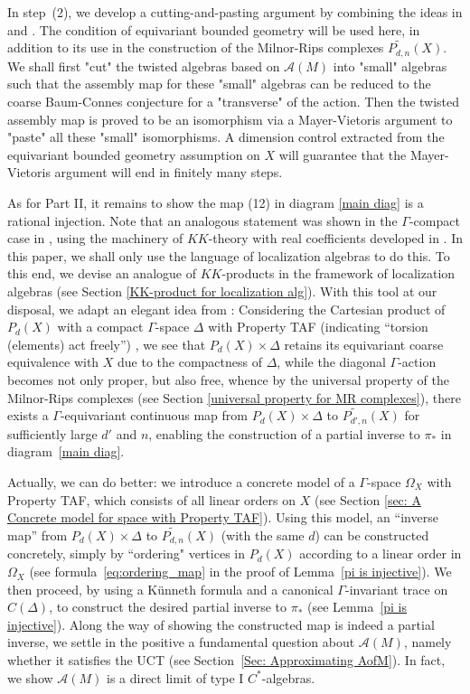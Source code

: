 \documentclass[11pt]{article}
\theoremstyle{definition}
\theoremstyle{plain}
\def\A{\mathcal A}\def\C{\mathcal C}\def\B{\mathcal B}\def\E{\mathcal E}\def\O{\mathcal O}\def\h{\mathfrak h}\def\K{\mathcal K}\def\F{\mathcal F}\def\P{\mathcal P}\def\L{\mathcal L}\def\R{\mathcal R}\def\Q{\mathcal Q}\def\H{\mathcal H}\def\S{\mathcal S}\def\N{\mathcal N}\def\U{\mathcal U}\def\V{\mathcal V}
\def\MRdnX{\widetilde{P_{d,n}}(X)}
\def\Ga{\Gamma}
\begin{document}
In step~(2), we develop a cutting-and-pasting argument by combining the ideas in \cite{Yu2000} and \cite{GHT2000}. 
The condition of equivariant bounded geometry will be used here, in addition to its use in the construction of the Milnor-Rips complexes $\MRdnX$. 
We shall first "cut" the twisted algebras based on $\A(M)$ into "small" algebras such that the assembly map for these "small" algebras can be reduced to the coarse Baum-Connes conjecture for a "transverse" of the action. Then the twisted assembly map is proved to be an isomorphism via a Mayer-Vietoris argument to "paste" all these "small" isomorphisms. 
A dimension control extracted from the equivariant bounded geometry assumption on $X$ will guarantee that the Mayer-Vietoris argument will end in finitely many steps. 



As for Part II, it remains to show the map (12) in diagram \eqref{main diag} is a rational injection. Note that an analogous statement was shown in the $\Ga$-compact case in \cite{GWY2018}, using the machinery of $KK$-theory with real coefficients developed in \cite{AAS2020}. In this paper, we shall only use the language of localization algebras to do this. 
To this end, we devise an analogue of $KK$-products in the framework of localization algebras (see Section \ref{KK-product for localization alg}). 
With this tool at our disposal, we adapt an elegant idea from \cite{AAS2020}: Considering the Cartesian product of $P_d(X)$ with a compact $\Gamma$-space $\Delta$ with Property TAF (indicating ``torsion (elements) act freely'') \cite[Definition 5.2]{AAS2020}, we see that $P_d(X)\times\Delta$ retains its equivariant coarse equivalence with $X$ due to the compactness of $\Delta$, while the diagonal $\Gamma$-action becomes not only proper, but also free, whence by the universal property of the Milnor-Rips complexes (see Section \ref{universal property for MR complexes}), there exists a $\Gamma$-equivariant continuous map from $P_d(X)\times\Delta$ to $\widetilde{P_{d',n}}(X)$ for sufficiently large $d'$ and $n$, enabling the construction of a partial inverse to $\pi_*$ in diagram~\eqref{main diag}.

Actually, we can do better: we introduce a concrete model of a $\Ga$-space $\Omega_X$ with Property TAF, which consists of all linear orders on $X$ (see Section \ref{sec: A Concrete model for space with Property TAF}). Using this model, an ``inverse map'' from $P_d(X)\times\Delta$ to $\MRdnX$ (with the same $d$) can be constructed concretely, simply by ``ordering" vertices in $P_d(X)$ according to a linear order in $\Omega_X$ (see formula~\eqref{eq:ordering_map} in the proof of Lemma~\ref{pi is injective}).
We then proceed, by using a K\"unneth formula and a canonical $\Gamma$-invariant trace on $C(\Delta)$, to construct the desired partial inverse to $\pi_*$ (see Lemma~\ref{pi is injective}). 
Along the way of showing the constructed map is indeed a partial inverse, we settle in the positive a fundamental question about $\A(M)$, namely whether it satisfies the UCT (see Section~\ref{Sec: Approximating AofM}). In fact, we show $\A(M)$ is a direct limit of type I $C^*$-algebras.  
\end{document}
